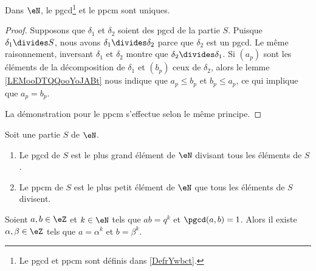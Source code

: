 \begin{lemma}       \label{LEMooBJVJooFyuFeN}
	Dans \( \eN\), le pgcd\footnote{Le pgcd et ppcm sont définis dans \ref{DefrYwbct}.} et le ppcm sont uniques.
\end{lemma}

\begin{proof}
	Supposons que \( \delta_1\) et \( \delta_2\) soient des pgcd de la partie \( S\). Puisque \( \delta_1\divides S\), nous avons \( \delta_1\divides \delta_2\) parce que \( \delta_2\) est un pgcd. Le même raisonnement, inversant \( \delta_1\) et \( \delta_2\) montre que \( \delta_2\divides \delta_1\). Si \( (a_p)\) sont les éléments de la décomposition de \( \delta_1\) et \( (b_p)\) ceux de \( \delta_2\), alors le lemme \ref{LEMooDTQQooYoJABt} nous indique que \( a_p\leq b_p\) et \( b_p\leq a_p\), ce qui implique que \( a_p=b_p\).

	La démonstration pour le ppcm s'effectue selon le même principe.
\end{proof}

\begin{lemma}       \label{LEMooJIGRooARiIPC}
	Soit une partie \( S\) de \( \eN\).
	\begin{enumerate}
		\item
		      Le pgcd de \( S\) est le plus grand élément de \( \eN\) divisant tous les éléments de \( S\).
		\item
		      Le ppcm de \( S\) est le plus petit élément de \( \eN\) que tous les éléments de \( S\) divisent.
	\end{enumerate}
\end{lemma}

\begin{lemma}        \label{LEMooEVIZooPAkQZW}
	Soient \( a,b\in \eZ\) et \( k\in \eN\) tels que \( ab=q^k\) et \( \pgcd(a,b)=1\). Alors il existe \( \alpha,\beta\in\eZ\) tels que \( a=\alpha^k\) et \( b=\beta^k\).
\end{lemma}

